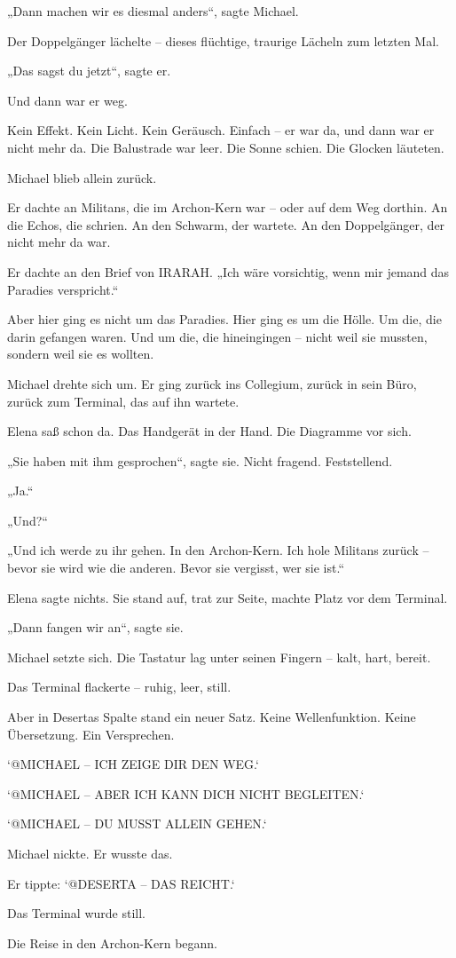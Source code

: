 \documentclass[
]{article}
\begin{document}
„Dann machen wir es diesmal anders``, sagte Michael.

Der Doppelgänger lächelte -- dieses flüchtige, traurige Lächeln zum letzten Mal.

„Das sagst du jetzt``, sagte er.

Und dann war er weg.

Kein Effekt. Kein Licht. Kein Geräusch. Einfach -- er war da, und dann war er nicht mehr da. Die Balustrade war leer. Die Sonne schien. Die Glocken läuteten.

Michael blieb allein zurück.

Er dachte an Militans, die im Archon-Kern war -- oder auf dem Weg dorthin. An die Echos, die schrien. An den Schwarm, der wartete. An den Doppelgänger, der nicht mehr da war.

Er dachte an den Brief von IRARAH. „Ich wäre vorsichtig, wenn mir jemand das Paradies verspricht.``

Aber hier ging es nicht um das Paradies. Hier ging es um die Hölle. Um die, die darin gefangen waren. Und um die, die hineingingen -- nicht weil sie mussten, sondern weil sie es wollten.

Michael drehte sich um. Er ging zurück ins Collegium, zurück in sein Büro, zurück zum Terminal, das auf ihn wartete.

Elena saß schon da. Das Handgerät in der Hand. Die Diagramme vor sich.

„Sie haben mit ihm gesprochen``, sagte sie. Nicht fragend. Feststellend.

„Ja.``

„Und?{\kern0pt}``

„Und ich werde zu ihr gehen. In den Archon-Kern. Ich hole Militans zurück -- bevor sie wird wie die anderen. Bevor sie vergisst, wer sie ist.``

Elena sagte nichts. Sie stand auf, trat zur Seite, machte Platz vor dem Terminal.

„Dann fangen wir an``, sagte sie.

Michael setzte sich. Die Tastatur lag unter seinen Fingern -- kalt, hart, bereit.

Das Terminal flackerte -- ruhig, leer, still.

Aber in Desertas Spalte stand ein neuer Satz. Keine Wellenfunktion. Keine Übersetzung. Ein Versprechen.

`@MICHAEL -- ICH ZEIGE DIR DEN WEG.`

`@MICHAEL -- ABER ICH KANN DICH NICHT BEGLEITEN.`

`@MICHAEL -- DU MUSST ALLEIN GEHEN.`

Michael nickte. Er wusste das.

Er tippte: `@DESERTA -- DAS REICHT.`

Das Terminal wurde still.

Die Reise in den Archon-Kern begann.
\end{document}
